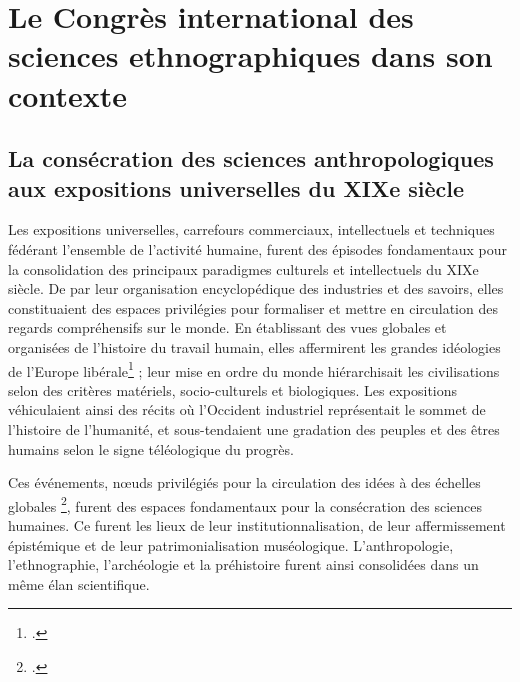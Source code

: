 \documentclass{article}
\begin{document}
	
	
	\section{Le Congrès international des sciences ethnographiques dans son contexte}
	
	\subsection{La consécration des sciences anthropologiques aux expositions universelles du XIXe siècle}
	
	Les expositions universelles, carrefours commerciaux, intellectuels et techniques fédérant l’ensemble de l’activité humaine, furent des épisodes fondamentaux pour la consolidation des principaux paradigmes culturels et intellectuels du XIXe siècle. De par leur organisation encyclopédique des industries et des savoirs, elles constituaient des espaces privilégies pour formaliser et mettre en circulation des regards compréhensifs sur le monde. En établissant des vues globales et organisées de l’histoire du travail humain, elles affermirent les grandes idéologies de l’Europe libérale\footcite{benjaminParisCapitaleXIXe2003} ; leur mise en ordre du monde hiérarchisait les civilisations selon des critères matériels, socio-culturels et biologiques. Les expositions véhiculaient ainsi des récits où l’Occident industriel représentait le sommet de l’histoire de l’humanité, et sous-tendaient une gradation des peuples et des êtres humains selon le signe téléologique du progrès.
	
	Ces événements, nœuds privilégiés pour la circulation des idées à des échelles globales \footcite{schusterWorldFairsSpaces2018}, furent des espaces fondamentaux pour la consécration des sciences humaines. Ce furent les lieux de leur institutionnalisation, de leur affermissement épistémique et de leur patrimonialisation muséologique. L’anthropologie, l’ethnographie, l’archéologie et la préhistoire furent ainsi consolidées dans un même élan scientifique.
	
\end{document}
